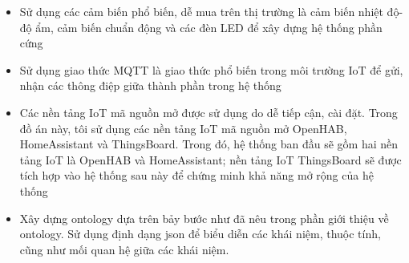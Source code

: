 \begin{itemize}
	\item Sử dụng các cảm biến phổ biến, dễ mua trên thị trường là cảm biến nhiệt độ-độ ẩm, cảm biến chuẩn động và các đèn LED để xây dựng hệ thống phần cứng
	\item Sử dụng giao thức MQTT là giao thức phổ biến trong môi trường IoT để gửi, nhận các thông điệp giữa thành phần trong hệ thống
	\item Các nền tảng IoT mã nguồn mở được sử dụng do dễ tiếp cận, cài đặt. Trong đồ án này, tôi sử dụng các nền tảng IoT mã nguồn mở OpenHAB, HomeAssistant và ThingsBoard. Trong đó, hệ thống ban đầu sẽ gồm hai nền tảng IoT là OpenHAB và HomeAssistant; nền tảng IoT ThingsBoard sẽ được tích hợp vào hệ thống sau này để chứng minh khả năng mở rộng của hệ thống
	\item Xây dựng ontology dựa trên bảy bước như đã nêu trong phần giới thiệu về ontology. Sử dụng định dạng json để biểu diễn các khái niệm, thuộc tính, cũng như mối quan hệ giữa các khái niệm.
\end{itemize}